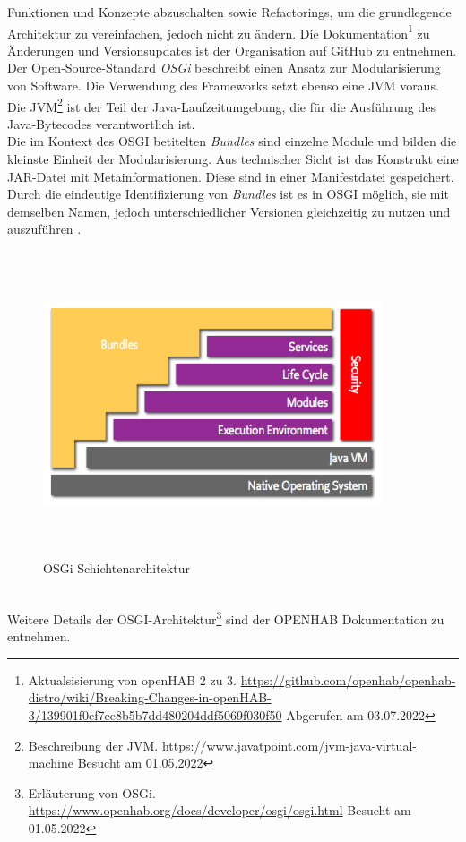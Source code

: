     Funktionen und Konzepte abzuschalten sowie Refactorings, um die grundlegende Architektur zu vereinfachen, jedoch nicht zu ändern. 
    Die Dokumentation\footnote{Aktualsisierung von openHAB 2 zu 3. \url{https://github.com/openhab/openhab-distro/wiki/Breaking-Changes-in-openHAB-3/139901f0ef7ee8b5b7dd480204ddf5069f030f50} Abgerufen am 03.07.2022} 
    zu Änderungen und Versionsupdates ist der Organisation auf GitHub zu entnehmen.
    \\
    \linebreak
    Der Open-Source-Standard \textit{OSGi} beschreibt einen Ansatz zur Modularisierung von Software. Die Verwendung des 
    Frameworks setzt ebenso eine \ac{JVM} voraus. 
    Die \acl{JVM}\footnote{Beschreibung der JVM. \url{https://www.javatpoint.com/jvm-java-virtual-machine} Besucht am 01.05.2022} 
    ist der Teil der Java-Laufzeitumgebung, die für die Ausführung des Java-Bytecodes verantwortlich ist.
    \\
    Die im Kontext des \acs{OSGI} betitelten \textit{Bundles} sind einzelne Module und bilden die kleinste Einheit der Modularisierung. Aus technischer Sicht ist 
    das Konstrukt eine \ac{JAR}-Datei mit Metainformationen. Diese sind in einer Manifestdatei gespeichert. Durch die eindeutige 
    Identifizierung von \textit{Bundles} ist es in \acs{OSGI} möglich, sie mit demselben Namen, jedoch unterschiedlicher 
    Versionen gleichzeitig zu nutzen und auszuführen \cite{openHAB-article}. 
    \begin{figure}[hbt!]
        \centering
        \includegraphics[width=10cm,height=9cm,keepaspectratio]{images/osgi-architecture.png}
        \caption{OSGi Schichtenarchitektur \cite{openhab-osgi}}
        \label{fig:osgilayer}
    \end{figure}
    \\
    Weitere Details der \acs{OSGI}-Architektur\footnote{Erläuterung von OSGi. \url{https://www.openhab.org/docs/developer/osgi/osgi.html} Besucht am 01.05.2022} 
    sind der \acs{OPENHAB} Dokumentation zu entnehmen.


